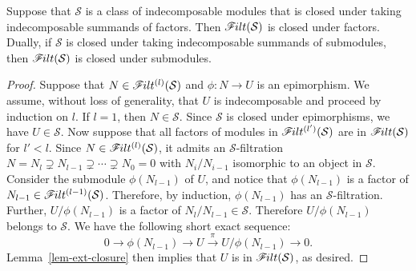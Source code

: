 \documentclass[ALCO,ThmDefs,Unicode,epreuves]{cedram}
\newcommand{\calS}{\mathcal{S}}
\newcommand{\filt}{\mathscr{F}\Mk ilt}
\renewcommand{\1}{\hat{1}}
\newcommand{\0}{\hat{0}}
\newcommand*{\Mk}{\mkern -2mu}
\begin{document}
\begin{lemma}\label{lem-epi-closure}
Suppose that $\calS$ is a class of indecomposable modules that is
closed under taking indecomposable summands of factors.
Then $\filt(\calS)$ is closed under factors.
Dually, if $\calS$ is closed under taking indecomposable summands of submodules, then $\filt(\calS)$ is closed under submodules.
\end{lemma}
\begin{proof}
 Suppose that $N\in \filt^{(l)}(\calS)$ and $\phi: N\rightarrow U$ is an epimorphism.
We assume, without loss of generality, that $U$ is indecomposable and proceed by induction on $l$.
If $l=1$, then $N\in \calS$.
Since $\calS$ is closed under epimorphisms, we have $U\in \calS$.
Now suppose that all factors of modules in $\filt^{(l^\prime)}(\calS)$
are in $\filt(\calS)$ for $l'<l$.
Since $N\in \filt^{(l)}(\calS)$, it admits an $\calS$-filtration $N=N_l\supsetneq N_{l-1} \supsetneq \cdots
\supsetneq N_0=0$ with $N_i/N_{i-1}$ isomorphic to an object in
$\calS$. Consider the submodule $\phi(N_{l-1})$ of $U$, and notice that $\phi(N_{l-1})$ is a factor of $N_{l-1}\in \filt^{(l-1)}(\calS)$.
Therefore, by induction, $\phi(N_{l-1})$ has an $\calS$-filtration.
Further, $U/\phi(N_{l-1})$ is a factor of $N_{l}/N_{l-1}\in\calS$.
Therefore $U/\phi(N_{l-1})$ belongs to $\calS$.
We have the following short exact sequence:
 \[
 0\rightarrow \phi(N_{l-1})\rightarrow U\stackrel{\pi}\rightarrow U/\phi(N_{l-1})\rightarrow 0.
 \]
Lemma~\ref{lem-ext-closure} then implies that $U$ is in $\filt(\calS)$, as desired.
\end{proof}
\end{document}
